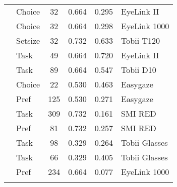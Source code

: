 \begin{longtable}{p{8cm}lcccl}
  \cite{schotter2010a} & Choice & 32 & 0.664 & 0.295 & EyeLink II \\ 
  \cite{schotter2012a} & Choice & 32 & 0.664 & 0.298 & EyeLink 1000 \\ 
  \cite{spinks2016a} & Setsize & 32 & 0.732 & 0.633 & Tobii T120 \\ 
  \cite{su2013} & Task & 49 & 0.664 & 0.720 & EyeLink II \\ 
  \cite{turner2014} & Task & 89 & 0.664 & 0.547 & Tobii D10 \\ 
  \cite{vanderlaan2015} & Choice & 22 & 0.530 & 0.463 & Easygaze \\ 
  \cite{vanderlaan2017} & Pref & 125 & 0.530 & 0.271 & Easygaze \\ 
  \cite{vanherpen2011} & Task & 309 & 0.732 & 0.161 & SMI RED \\ 
  \cite{vanloo2015} & Pref & 81 & 0.732 & 0.257 & SMI RED \\ 
  \cite{wastlund2015} & Task & 98 & 0.329 & 0.264 & Tobii Glasses \\ 
  \cite{wastlund2015} & Task & 66 & 0.329 & 0.405 & Tobii Glasses \\ 
  \cite{wolfson2017} & Pref & 234 & 0.664 & 0.077 & EyeLink 1000 \\ 
  \hline
\label{tab:overviewtable}
\end{longtable}
